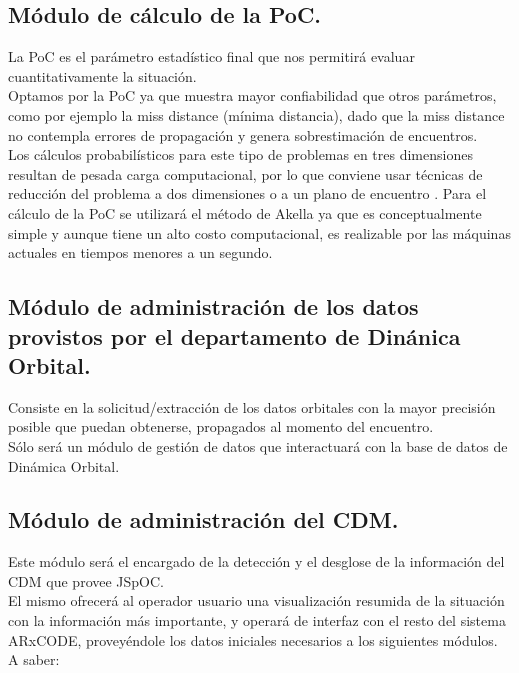 \subsection*{M\'odulo de cálculo de la PoC.}
La PoC es el par\'ametro estad\'istico final que nos permitir\'a evaluar cuantitativamente la situaci\'on.\\
Optamos por la PoC ya que muestra mayor confiabilidad que otros par\'ametros, como por ejemplo la miss distance (m\'inima distancia), dado que la miss distance no contempla errores de propagaci\'on y genera sobrestimaci\'on de encuentros.\\
Los c\'alculos probabil\'isticos para este tipo de problemas en tres dimensiones resultan de pesada carga computacional, por lo que conviene usar t\'ecnicas de reducci\'on del problema a dos dimensiones o a un plano de encuentro \cite{foster}. Para el c\'alculo de la PoC se utilizar\'a el m\'etodo de Akella \cite{akellaAlfriend} ya que es conceptualmente simple y aunque tiene un alto costo computacional, es realizable por las m\'aquinas actuales en tiempos menores a un segundo.\\

\subsection*{M\'odulo de administraci\'on de los datos provistos por el departamento de Din\'anica Orbital.}
Consiste en la solicitud/extracci\'on de los datos orbitales con la mayor precisi\'on posible que puedan obtenerse, propagados al momento del encuentro.\\
S\'olo ser\'a un m\'odulo de gesti\'on de datos que interactuar\'a con la base de datos de Din\'amica Orbital.\\ 


\subsection*{M\'odulo de administraci\'on del CDM.}
Este m\'odulo ser\'a el encargado de la detecci\'on y el desglose de la informaci\'on del CDM que provee JSpOC.\\
El mismo ofrecer\'a al operador usuario una visualizaci\'on resumida de la situaci\'on con la informaci\'on m\'as importante, y operar\'a de interfaz con el resto del sistema ARxCODE, provey\'endole los datos iniciales necesarios a los siguientes m\'odulos. A saber:\\

